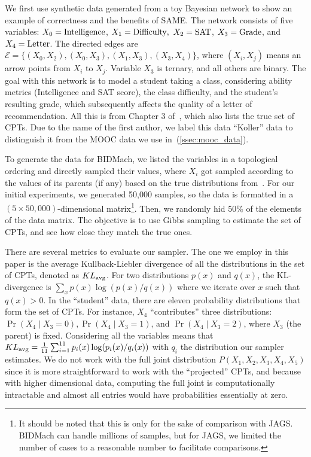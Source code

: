 \documentclass{article} %
\begin{document}
We first use synthetic data generated from a toy Bayesian network to show an example of correctness
and the benefits of SAME. The network consists of five variables: $X_0 = {\rm Intelligence}$, $X_1 =
{\rm Difficulty},$ $X_2 = {\rm SAT}$, $X_3 = {\rm Grade}$, and $X_4 = {\rm Letter}$. The directed
edges are $\mathcal{E} = \{(X_0, X_2), (X_0, X_3), (X_1,X_3), (X_3,X_4)\}$, where $(X_i,X_j)$ means
an arrow points from $X_i$ to $X_j$.  Variable $X_3$ is ternary, and all others are binary. The goal
with this network is to model a student taking a class, considering ability metrics (Intelligence
and SAT score), the class difficulty, and the student's resulting grade, which subsequently affects
the quality of a letter of recommendation. All this is from Chapter 3 of~\citet{Koller2009}, which
also lists the true set of CPTs. Due to the name of the first author, we label this data ``Koller''
data to distinguish it from the MOOC data we use in~(\ref{ssec:mooc_data}).

To generate the data for BIDMach, we listed the variables in a topological ordering and directly
sampled their values, where $X_i$ got sampled according to the values of its parents (if any) based
on the true distributions from~\citet{Koller2009}. For our initial experiments, we generated 50,000
samples, so the data is formatted in a $(5\times 50,000)$-dimensional matrix\footnote{It should be
noted that this is only for the sake of comparison with JAGS. BIDMach can handle millions of
samples, but for JAGS, we limited the number of cases to a reasonable number to facilitate
comparisons.}. Then, we randomly hid 50\% of the elements of the data matrix. The objective is to
use Gibbs sampling to estimate the set of CPTs, and see how close they match the true ones.

There are several metrics to evaluate our sampler. The one we employ in this paper is the average
Kullback-Liebler divergence of all the distributions in the set of CPTs, denoted as $KL_{\rm avg}$.
For two distributions $p(x)$ and $q(x)$, the KL-divergence is $\sum_x p(x) \log(p(x)/q(x))$ where we
iterate over $x$ such that $q(x) > 0$. In the ``student'' data, there are eleven probability
distributions that form the set of CPTs. For instance, $X_4$ ``contributes'' three distributions:
$\Pr(X_4 \mid X_3 = 0), \Pr(X_4 \mid X_3 = 1)$, and $\Pr(X_4 \mid X_3 = 2)$, where $X_3$ (the
parent) is fixed. Considering all the variables means that $KL_{\rm avg} = \frac{1}{11}
\sum_{i=1}^{11} p_i(x) \log(p_i(x)/q_i(x))$ with $q_i$ the distribution our sampler estimates. We do
not work with the full joint distribution $P(X_1,X_2,X_3,X_4,X_5)$ since it is more straightforward
to work with the ``projected'' CPTs, and because with higher dimensional data, computing the full
joint is computationally intractable and almost all entries would have probabilities essentially at
zero.
\end{document}
